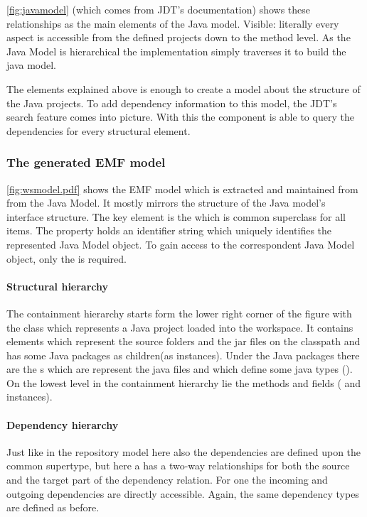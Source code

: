 \autoref{fig:javamodel} (which comes from JDT's documentation) shows these
relationships as the main elements of the Java model. Visible: literally every aspect 
is accessible from the defined projects down to the method level. As the Java Model 
is hierarchical the implementation simply traverses it to build the java model. 

The elements explained above is enough to create a model about the structure of
the Java projects. To add dependency information to this model, the JDT's search
feature comes into picture. With this the component is able to query the dependencies
for every structural element. 

\subsubsection{The generated EMF model}
\autoref{fig:wsmodel.pdf} shows the EMF model which is extracted and maintained
from from the Java Model. It mostly mirrors the structure of the Java model's
interface structure. The key element is the  which is common
superclass for all items. The  property holds an identifier string
which uniquely identifies the represented Java Model object. To gain access to
the correspondent Java Model object, only the  is
required.

\paragraph{Structural hierarchy}
The containment hierarchy starts form the lower right corner of the figure with
the  class which represents a Java project loaded into the
workspace. It contains  elements which represent the
source folders and the jar files on the classpath and has some Java packages as
children(as  instances). Under the Java packages there
are the s which are represent the java files and which
define some java types (). On the lowest level in the containment
hierarchy lie the methods and fields ( and 
instances).

\paragraph{Dependency hierarchy}
Just like in the repository model here also the dependencies are defined upon
the common supertype, but here a  has a two-way relationships
for both the source and the target part of the dependency relation. For one
 the incoming and outgoing dependencies are directly
accessible. Again, the same dependency types are defined as before.

